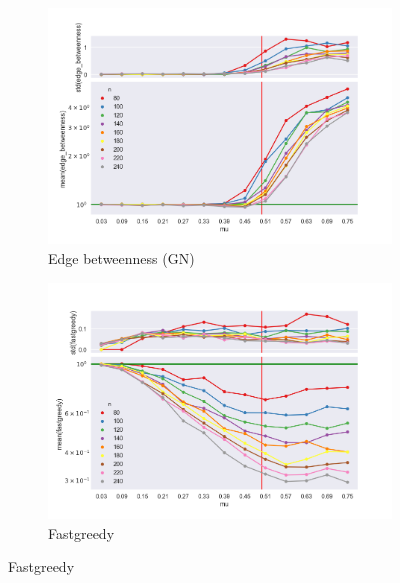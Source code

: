 \begin{figure}
\centering
    \begin{subfigure}[b]{0.32\textwidth}
        \includegraphics[width=\textwidth]{fig/ratio_vs_mu_edge_betweenness}
        \caption{Edge betweenness (GN)}
        \label{fig:gull}
    \end{subfigure}
    \qquad
    \begin{subfigure}[b]{0.32\textwidth}
        \includegraphics[width=\textwidth]{fig/ratio_vs_mu_fastgreedy}
        \caption{Fastgreedy}
        \label{fig:tiger}
    \end{subfigure}
    

\end{figure}
